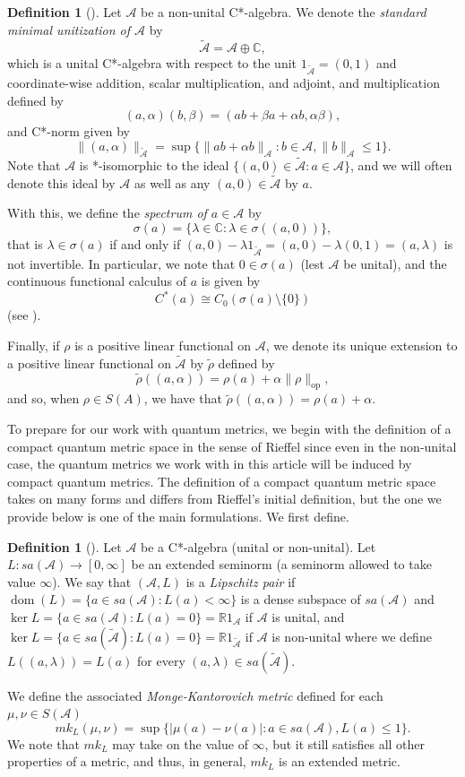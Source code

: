 \documentclass{amsart}
\theoremstyle{plain}
\theoremstyle{definition}
\newtheorem{definition}[theorem]{Definition}
\theoremstyle{remark}
\numberwithin{equation}{section}
\newcommand{\A}{{\mathcal{A}}}
\newcommand{\wt}[1]{{\widetilde{#1}}}
\newcommand{\un}[1]{{1_{\widetilde{#1}}}}
\newcommand{\la}{{\lambda}}
\newcommand{\al}{{\alpha}}
\newcommand{\be}{{\beta}}
\newcommand{\R}{{\mathds{R}}}
\newcommand{\C}{{\mathds{C}}}
\newcommand{\dom}[1]{{\operatorname*{dom}({#1})}}
\renewcommand{\leq}{\leqslant}
\begin{document}
\begin{definition}[{\cite[Proposition I.1.3]{Davidson}}]\label{d:unitization}
    Let $\A$ be a non-unital C*-algebra. We denote the {\em standard minimal unitization of $\A$} by 
    \[
    \wt{\A}=\A\oplus \C,
    \]
    which is a unital C*-algebra with respect to  the unit $\un{\A}=(0,1)$ and coordinate-wise addition, scalar multiplication, and adjoint, and multiplication defined by 
    \[
    (a,\al)(b,\be)=(ab+\be a+\al b, \al\be),
    \]
    and C*-norm given by
    \[
    \|(a,\al)\|_{\wt{\A}}=\sup \{\|ab+\al b\|_\A : b\in \A, \|b\|_\A\leq 1\}.
    \]
    Note that $\A$ is *-isomorphic to the ideal $\{(a,0)\in \wt{\A}: a\in \A\}$, and we will often denote this ideal by $\A$ as well as any $(a,0)\in \wt{\A}$ by $a$.

    With this, we define the {\em spectrum of $a\in \A$} by
    \[
    \sigma(a)=\{\la \in \C : \la\in \sigma((a,0))\},
    \]
    that is $\la\in \sigma(a)$ if and only if $(a,0)-\la\un{\A}=(a,0)-\la(0,1)=(a,\la)$ is not invertible. In particular, we note that $0\in \sigma(a)$ (lest $\A$ be unital), and the continuous functional calculus of $a$ is given by 
    \[
    C^*(a)\cong C_0(\sigma(a)\setminus \{0\})
    \]
    (see \cite[Corollary I.3.2]{Davidson}).

    Finally, if $\rho $ is a positive linear functional on $\A$, we denote its unique extension to a positive linear functional on $\wt{\A}$ by $\wt{\rho}$ defined by
    \[
    \wt{\rho}((a, \al))=\rho(a)+\al\|\rho\|_\mathrm{op},
    \] 
    and so, when $\rho\in S(A)$, we have that $\wt{\rho}((a,\al))=\rho(a)+\al$. 
\end{definition}
 
To prepare for our work with quantum metrics, we begin with the definition of a compact quantum metric space in the sense of Rieffel since even in the non-unital case,  the  quantum metrics we work with in this article will be induced by compact quantum metrics. The definition of a compact quantum metric space takes on many forms and differs from Rieffel's initial definition, but the one we provide below is one of the main formulations. We first define. 
\begin{definition}[{\cite[Definition 2.3 and Remark 2.5 and 2.9]{Latremoliere12b}}]\label{d:l-pair}
    Let $\A$ be  a C*-algebra (unital or non-unital). Let $L:sa(\A) \rightarrow [0,\infty]$ be an extended seminorm (a seminorm allowed to take value $\infty$). We say that $(\A, L)$ is a {\em Lipschitz pair} if  $\dom{L}=\{a\in sa(\A): L(a)<\infty\}$  is a dense subspace of $sa(\A)$ and $\ker L=\{a\in sa(\A): L(a)=0\}=\R1_\A$ if $\A$ is unital, and $\ker L=\{a\in sa(\wt{\A}): L(a)=0\}=\R1_{\wt{\A}}$ if $\A$ is non-unital where we define $L((a,\la))=L(a)$ for every $(a,\la)\in sa(\wt{\A})$.

    We define the associated  {\em  Monge-Kantorovich metric} defined for each $\mu,\nu\in S(\A)$
        \[
        mk_L(\mu,\nu)=\sup \{|\mu(a)-\nu(a)| : a\in sa(\A), L(a)\leq 1\}.
        \] 
        We note that $mk_L$ may take on the value of  $\infty$, but it still satisfies all other properties of a metric, and thus, in general, $mk_L$ is an extended metric.
\end{definition}
\end{document}
